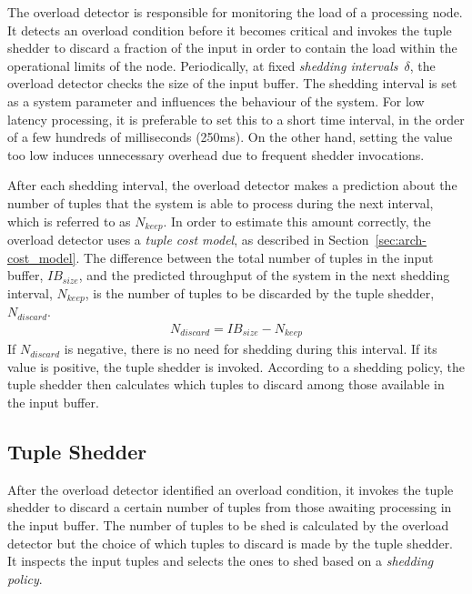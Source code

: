 The overload detector is responsible for monitoring the load of a processing node. It detects an
overload condition before it becomes critical and invokes the tuple shedder to discard a fraction of the
input in order to contain the load within the operational limits of the node.
Periodically, at fixed \emph{shedding intervals}~$\delta$, the overload detector checks the size of the
input buffer.
The shedding interval is set as a system parameter and influences the behaviour of the system. 
For low latency processing, it is preferable to set this to a short time interval, in the order of a few
hundreds of milliseconds (\eg 250ms). On the other hand, setting the value too low induces unnecessary
overhead due to frequent shedder invocations.

After each shedding interval, the overload detector makes a prediction about the number of tuples that
the system is able to process during the next interval, which is referred to as $N_{keep}$. In order
to estimate this amount correctly, the overload detector uses a \emph{tuple cost model}, as
described in Section~\ref{sec:arch-cost_model}. 
The difference between the total number of tuples in the input buffer, $\textit{IB}_{size}$, and the
predicted throughput of the system in the next shedding interval, $N_{keep}$, is the number of tuples
to be discarded by the tuple shedder, $N_{discard}$.
\begin{align}
	N_{discard} = \textit{IB}_{size} - N_{keep}
\end{align}
If $N_{discard}$ is negative, there is no need for shedding during this interval. If its value is
positive, the tuple shedder is invoked. According to a shedding policy, the tuple shedder then calculates
which tuples to discard among those available in the input buffer.

\subsection*{Tuple Shedder} 
\label{sec:arch-tuple_shedder}

After the overload detector identified an overload condition, it invokes the tuple shedder to discard
a certain number of tuples from those awaiting processing in the input buffer.
The number of tuples to be shed is calculated by the overload detector but the choice of which tuples
to discard is made by the tuple shedder. 
It inspects the input tuples and selects the ones to shed based on a \emph{shedding policy}.

